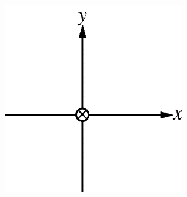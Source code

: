 \begin{figure}[H]
    \centering
    \includegraphics[scale=0.4]{images/img-009-019.png}
\end{figure}

